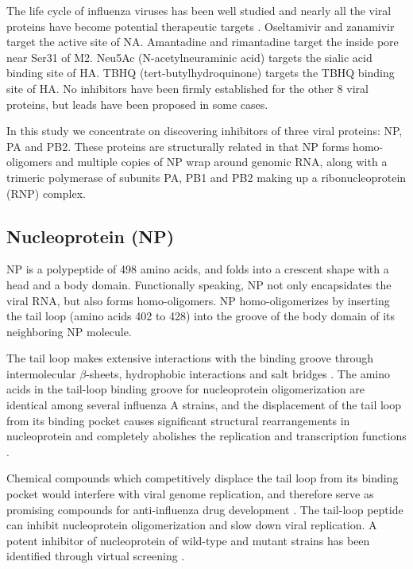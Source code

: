 The life cycle of influenza viruses has been well studied \citep{1539,1522,1559} and nearly all the viral proteins have become potential therapeutic targets \citep{1539,1229,1519}. Oseltamivir and zanamivir target the active site of NA. Amantadine and rimantadine target the inside pore near Ser31 of M2. Neu5Ac (N-acetylneuraminic acid) targets the sialic acid binding site of HA. TBHQ (tert-butylhydroquinone) targets the TBHQ binding site of HA. No inhibitors have been firmly established for the other 8 viral proteins, but leads have been proposed in some cases.

In this study we concentrate on discovering inhibitors of three viral proteins: NP, PA and PB2. These proteins are structurally related in that NP forms homo-oligomers and multiple copies of NP wrap around genomic RNA, along with a trimeric polymerase of subunits PA, PB1 and PB2 making up a ribonucleoprotein (RNP) complex.

\subsection{Nucleoprotein (NP)}

NP is a polypeptide of 498 amino acids, and folds into a crescent shape with a head and a body domain. Functionally speaking, NP not only encapsidates the viral RNA, but also forms homo-oligomers. NP homo-oligomerizes by inserting the tail loop (amino acids 402 to 428) into the groove of the body domain of its neighboring NP molecule.

The tail loop makes extensive interactions with the binding groove through intermolecular $\beta$-sheets, hydrophobic interactions and salt bridges \citep{1140}. The amino acids in the tail-loop binding groove for nucleoprotein oligomerization are identical among several influenza A strains, and the displacement of the tail loop from its binding pocket causes significant structural rearrangements in nucleoprotein and completely abolishes the replication and transcription functions \citep{1231}.

Chemical compounds which competitively displace the tail loop from its binding pocket would interfere with viral genome replication, and therefore serve as promising compounds for anti-influenza drug development \citep{1140,1231,1232}. The tail-loop peptide can inhibit nucleoprotein oligomerization and slow down viral replication. A potent inhibitor of nucleoprotein of wild-type and mutant strains has been identified through virtual screening \citep{1233}.

